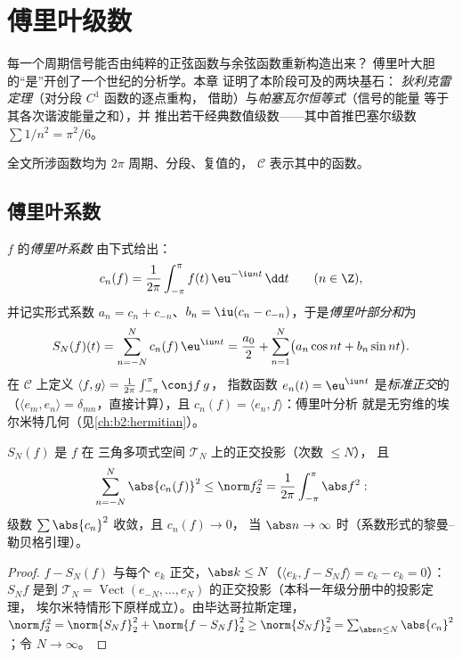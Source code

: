  \chapter{傅里叶级数}\label{ch:b2:fourier}

每一个周期信号能否由纯粹的正弦函数与余弦函数重新构造出来？
傅里叶大胆的“是”开创了一个世纪的分析学。本章
证明了本阶段可及的两块基石：
\emph{狄利克雷定理}（对分段 $C^1$ 函数的逐点重构，
借助）与\emph{帕塞瓦尔恒等式}（信号的能量
等于其各次谐波能量之和），并
推出若干经典数值级数——其中首推巴塞尔级数 $\sum 1/n^2 =
\pi^2/6$。

全文所涉函数均为 $2\pi$ 周期、分段、复值的，
$\mathcal{C}$ 表示其中的函数。

\section{傅里叶系数}

\begin{definition}\label{def:b2:fourier:coefficients}
$f$ 的\emph{傅里叶系数}
由下式给出：
\[
c_n(f) = \frac{1}{2\pi}\int_{-\pi}^{\pi} f(t)\,\eu^{-\iu n t}\,\dd
t \qquad (n \in \Z),
\]
并记实形式系数 $a_n = c_n + c_{-n}$、$b_n = \iu(c_n
- c_{-n})$，于是\emph{傅里叶部分和}为
\[
S_N(f)(t) = \sum_{n=-N}^{N} c_n(f)\,\eu^{\iu nt}
= \frac{a_0}{2} + \sum_{n=1}^{N}\bigl(a_n\cos nt + b_n \sin
nt\bigr).
\]
在 $\mathcal{C}$ 上定义 $\langle f,
g\rangle = \frac{1}{2\pi}\int_{-\pi}^{\pi}\conj f\,g$，
指数函数 $e_n(t) = \eu^{\iu nt}$ 是\emph{标准正交}的
（$\langle e_m, e_n\rangle = \delta_{mn}$，直接计算），且
$c_n(f) = \langle e_n, f\rangle$：傅里叶分析
就是无穷维的埃尔米特几何（见\cref{ch:b2:hermitian}）。
\end{definition}

\begin{proposition}[贝塞尔不等式]\label{prop:b2:fourier:bessel}
$S_N(f)$ 是 $f$ 在
三角多项式空间 $\mathcal{T}_N$ 上的正交投影（次数 $\leq N$），
且
\[
\sum_{n=-N}^{N} \abs{c_n(f)}^2 \leq \norm f_2^2 =
\frac{1}{2\pi}\int_{-\pi}^{\pi} \abs f^2 :
\]
级数 $\sum \abs{c_n}^2$ 收敛，且 $c_n(f) \to 0$，
当 $\abs n \to \infty$ 时（系数形式的黎曼–勒贝格引理）。
\end{proposition}

\begin{proof}
$f - S_N(f)$ 与每个 $e_k$ 正交，$\abs k \leq N$（$\langle
e_k, f - S_N f\rangle = c_k - c_k = 0$）：$S_Nf$ 是到
$\mathcal{T}_N = \operatorname{Vect}(e_{-N}, \dots,
e_N)$ 的正交投影（本科一年级分册中的投影定理，
埃尔米特情形下原样成立）。由毕达哥拉斯定理，$\norm f_2^2 = \norm{S_Nf}_2^2 +
\norm{f - S_Nf}_2^2 \geq \norm{S_Nf}_2^2 = \sum_{\abs n \leq N}
\abs{c_n}^2$；令 $N \to \infty$。
\end{proof}

